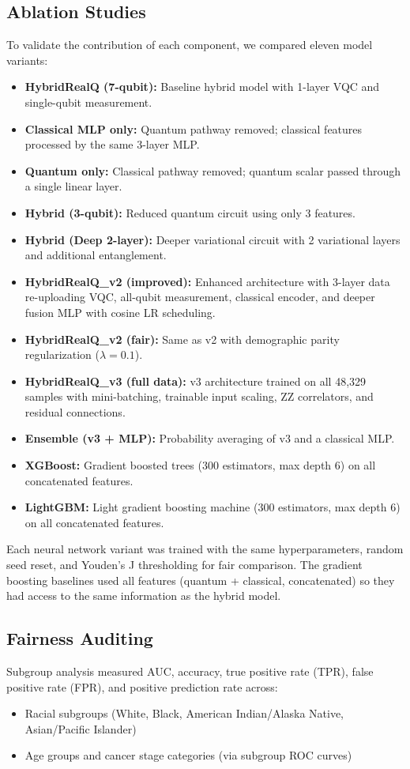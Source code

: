 \documentclass[12pt, letterpaper]{article}
\begin{document}
\subsection{Ablation Studies}
To validate the contribution of each component, we compared eleven model variants:
\begin{itemize}
    \item \textbf{HybridRealQ (7-qubit):} Baseline hybrid model with 1-layer VQC and single-qubit measurement.
    \item \textbf{Classical MLP only:} Quantum pathway removed; classical features processed by the same 3-layer MLP.
    \item \textbf{Quantum only:} Classical pathway removed; quantum scalar passed through a single linear layer.
    \item \textbf{Hybrid (3-qubit):} Reduced quantum circuit using only 3 features.
    \item \textbf{Hybrid (Deep 2-layer):} Deeper variational circuit with 2 variational layers and additional entanglement.
    \item \textbf{HybridRealQ\_v2 (improved):} Enhanced architecture with 3-layer data re-uploading VQC, all-qubit measurement, classical encoder, and deeper fusion MLP with cosine LR scheduling.
    \item \textbf{HybridRealQ\_v2 (fair):} Same as v2 with demographic parity regularization ($\lambda = 0.1$).
    \item \textbf{HybridRealQ\_v3 (full data):} v3 architecture trained on all 48{,}329 samples with mini-batching, trainable input scaling, ZZ correlators, and residual connections.
    \item \textbf{Ensemble (v3 + MLP):} Probability averaging of v3 and a classical MLP.
    \item \textbf{XGBoost:} Gradient boosted trees (300 estimators, max depth 6) on all concatenated features.
    \item \textbf{LightGBM:} Light gradient boosting machine (300 estimators, max depth 6) on all concatenated features.
\end{itemize}

Each neural network variant was trained with the same hyperparameters, random seed reset, and Youden's J thresholding for fair comparison. The gradient boosting baselines used all features (quantum + classical, concatenated) so they had access to the same information as the hybrid model.

\subsection{Fairness Auditing}
Subgroup analysis measured AUC, accuracy, true positive rate (TPR), false positive rate (FPR), and positive prediction rate across:
\begin{itemize}
    \item Racial subgroups (White, Black, American Indian/Alaska Native, Asian/Pacific Islander)
    \item Age groups and cancer stage categories (via subgroup ROC curves)
\end{itemize}
\end{document}
